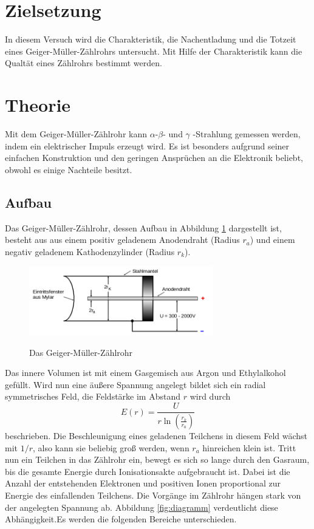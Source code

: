 \section{Zielsetzung}
In diesem Versuch wird die Charakteristik, die Nachentladung und die
Totzeit eines Geiger-Müller-Zählrohrs untersucht. Mit Hilfe der
Charakteristik kann die Qualtät eines Zählrohrs bestimmt werden.

\section{Theorie}
\label{sec:Theorie}

Mit dem Geiger-Müller-Zählrohr kann $\alpha$-\;$\beta$- und $\gamma$ -Strahlung gemessen
werden, indem ein elektrischer Impuls erzeugt wird. Es ist besonders aufgrund seiner
einfachen Konstruktion und den geringen Ansprüchen an die Elektronik beliebt, obwohl es
einige Nachteile besitzt.

\subsection{Aufbau}


Das Geiger-Müller-Zählrohr, dessen Aufbau in Abbildung \ref{fig:geiger}
dargestellt ist, besteht aus aus einem positiv geladenem Anodendraht (Radius $r_a$) und
einem negativ geladenem Kathodenzylinder (Radius $r_k$).

\begin{figure}
  \centering
  \includegraphics[width=8cm]{geiger.png}
  \caption{Das Geiger-Müller-Zählrohr}
  \label{fig:geiger}
  \cite{skript}
\end{figure}

Das innere Volumen ist mit einem Gasgemisch aus Argon und
Ethylalkohol gefüllt. Wird nun eine äußere Spannung angelegt bildet sich ein
radial symmetrisches Feld, die Feldstärke im Abstand $r$ wird durch
\begin{equation}
  E(r)=\frac{U}{r\ln(\frac{r_k}{r_a})}
\end{equation}
beschrieben. Die Beschleunigung eines geladenen Teilchens in diesem Feld
wächst mit $1/r$, also kann sie beliebig groß werden, wenn $r_a$ hinreichen
klein ist.
Tritt nun ein Teilchen in das Zählrohr ein, bewegt es sich so lange durch den
Gasraum, bis die gesamte Energie durch Ionisationsakte aufgebraucht ist.
Dabei ist die Anzahl der entstehenden Elektronen und positiven Ionen proportional
zur Energie des einfallenden Teilchens.
Die Vorgänge im Zählrohr hängen stark von der angelegten Spannung ab. Abbildung
\ref{fig:diagramm} verdeutlicht diese Abhängigkeit.Es werden
die folgenden Bereiche unterschieden.

